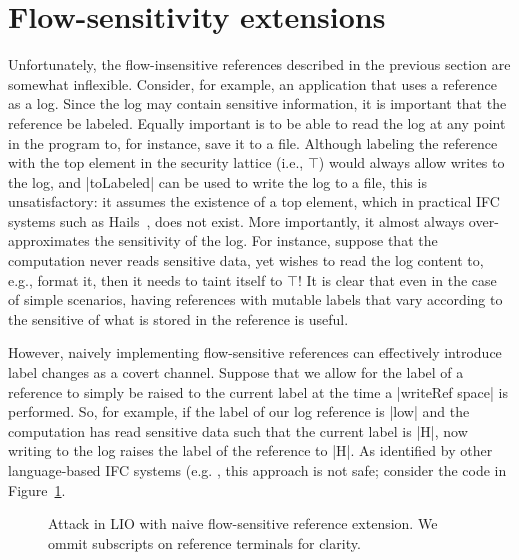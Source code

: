 \section{Flow-sensitivity extensions}
\label{sec:flow-sensitive}

Unfortunately, the flow-insensitive references described in the previous section
are somewhat inflexible.
%
Consider, for example, an application that uses a reference as a log.
%
Since the log may contain sensitive information, it is important that the
reference be labeled.
%
Equally important is to be able to read the log at any point in the program to,
for instance, save it to a file.
%
Although labeling the reference with the top element in the
security lattice (i.e., $\top$) would always allow writes to the log, and |toLabeled| can be
used to write the log to a file, this is unsatisfactory: it assumes the
existence of a top element, which in practical IFC systems such as
Hails~\cite{giffin:hails}, does not exist.
%
More importantly, it almost always over-approximates the sensitivity of the
log. For instance, suppose that the computation never reads sensitive data, yet wishes to
read the log content to, e.g., format it, then it needs to taint itself to $\top$!
%
It is clear that even in the case of simple scenarios, having references with
mutable labels that vary according to the sensitive of what is stored in the
reference is useful.

However, naively implementing flow-sensitive references can effectively
introduce label changes as a covert channel. 
%
Suppose that we allow for the label of a reference to simply be raised to the
current label at the time a |writeRef space| is performed.
%
So, for example, if the label of our log reference is |low| and the computation
has read sensitive data such that the current label is |H|, now writing to the
log raises the label of the reference to |H|.
%
As identified by other language-based IFC systems
(e.g. \cite{Russo:2010,Austin:Flanagan:PLAS09,Austin:Flanagan:PLAS10}, this
approach is not safe; consider the code in Figure~\ref{fig:fs-attack}.
%
%
\begin{figure}[t]
\small
{}
\cut{$}
\caption{Attack in LIO with naive flow-sensitive reference extension. We ommit
subscripts on reference terminals for clarity.  \label{fig:fs-attack}}
\end{figure}


